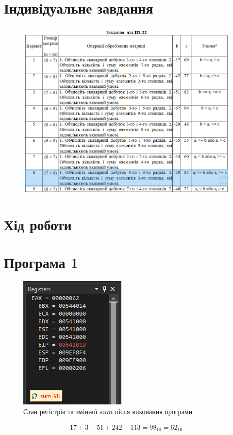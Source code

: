 \documentclass{article}
\begin{document}
\begin{normalsize}
	\section*{Індивідуальне завдання}
	\begin{figure}[H]
		\centering
		\includegraphics[scale=0.6]{v}
	\end{figure}
	
	\section*{Хід роботи}
	\section*{Програма 1}
	\begin{figure}[H]
		\centering
		\includegraphics[scale=1]{1}
		\caption{Стан регістрів та змінної $sum$ після виконання програми}
	\end{figure}
	\begin{gather}
		17+3-51+242-113=98_{10}=62_{16}\nonumber
	\end{gather}


\end{normalsize}
\end{document}
